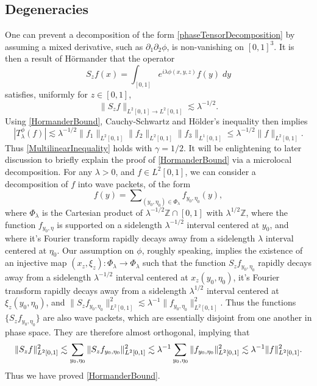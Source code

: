 \documentclass[12pt]{amsart}
\newcommand*{\Z}{\mathbb{Z}}
\begin{document}
\subsection{Degeneracies}

One can prevent a decomposition of the form \eqref{phaseTensorDecomposition} by assuming a mixed derivative, such as $\partial_1 \partial_2 \phi$, is non-vanishing on $[0,1]^3$. It is then a result of H\"{o}rmander \cite{Hormander} that the operator
%
\begin{equation}
	S_zf(x) = \int_{[0,1]} e^{i \lambda \phi(x,y,z)} f(y)\; dy
\end{equation}
%
satisfies, uniformly for $z \in [0,1]$,
%
\begin{equation} \label{HormanderBound}
	\| S_z f \|_{L^2[0,1] \to L^2[0,1]} \lesssim \lambda^{-1/2}.
\end{equation}
%
Using \eqref{HormanderBound}, Cauchy-Schwartz and H\"{o}lder's inequality then implies
%
\begin{equation}
	|T^\phi_\lambda(f)| \lesssim \lambda^{-1/2} \| f_1 \|_{L^2[0,1]} \| f_2 \|_{L^2[0,1]} \| f_3 \|_{L^1[0,1]} \leq \lambda^{-1/2} \| f \|_{L^2[0,1]}.
\end{equation}
%
Thus \eqref{MultilinearInequality} holds with $\gamma = 1/2$. It will be enlightening to later discussion to briefly explain the proof of \eqref{HormanderBound} via a microlocal decomposition. For any $\lambda > 0$, and $f \in L^2[0,1]$, we can consider a decomposition of $f$ into wave packets, of the form
%
\begin{equation}
	f(y) = \sum\nolimits_{(y_0,\eta_0) \in \Phi_\lambda} f_{y_0,\eta_0}(y),
\end{equation}
%
where $\Phi_\lambda$ is the Cartesian product of $\lambda^{-1/2} \Z \cap [0,1]$ with $\lambda^{1/2} \Z$, where the function $f_{y_0,\eta}$ is supported on a sidelength $\lambda^{-1/2}$ interval centered at $y_0$, and where it's Fourier transform rapidly decays away from a sidelength $\lambda$ interval centered at $\eta_0$.
%
%
Our assumption on $\phi$, roughly speaking, implies the existence of an injective map $(x_z,\xi_z): \Phi_\lambda \to \Phi_\lambda$ such that the function $S_z f_{y_0,\eta_0}$ rapidly decays away from a sidelength $\lambda^{-1/2}$ interval centered at $x_z(y_0,\eta_0)$, it's Fourier transform rapidly decays away from a sidelength $\lambda^{1/2}$ interval centered at $\xi_z(y_0,\eta_0)$, and $\| S_z f_{y_0,\eta_0} \|_{L^2[0,1]}^2 \lesssim \lambda^{-1} \| f_{y_0,\eta_0} \|_{L^2[0,1]}^2$. Thus the functions $\{ S_z f_{y_0,\eta_0} \}$ are also wave packets, which are essentially disjoint from one another in phase space. They are therefore almost orthogonal, implying that
%
\[
 \| S_z f \|_{L^2[0,1]}^2 \lesssim \sum_{y_0,\eta_0} \| S_z f_{y_0,\eta_0} \|_{L^2[0,1]}^2\\
	\lesssim \lambda^{-1} \sum_{y_0,\eta_0} \| f_{y_0,\eta_0} \|_{L^2[0,1]}^2 \lesssim \lambda^{-1} \| f \|_{L^2[0,1]}^2.
\]
%
Thus we have proved \eqref{HormanderBound}.
\end{document}
